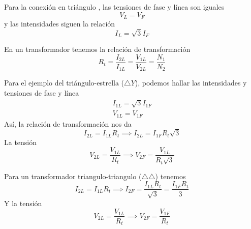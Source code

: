 \documentclass[11pt]{report}
\begin{document}
Para la conexión en triángulo , las tensiones de fase y línea son iguales
\begin{equation*}
  V_L = V_F
\end{equation*}
y las intensidades siguen la relación
\begin{equation*}
  I_L = \sqrt{3} I_F
\end{equation*}

En un transformador tenemos la relación de transformación
\begin{equation}
  R_t = \frac{I_{2L}}{I_{1L}} = \frac{V_{1L}}{V_{2L}} = \frac{N_1}{N_2}
\end{equation}

Para el ejemplo del triángulo-estrella ($\triangle Y$), podemos hallar las intensidades y
tensiones de fase y línea
\begin{equation*}
  \begin{split}
    I_{1L} = \sqrt{3} I_{1F}\\
    V_{1L} = V_{1F}
  \end{split}
\end{equation*}
Así, la relación de transformación nos da
\begin{equation*}
  I_{2L} = I_{1L} R_t \implies	I_{2L} = I_{1F} R_t \sqrt{3}
\end{equation*}
La tensión
\begin{equation*}
  V_{2L} = \frac{V_{1L}}{R_t} \implies V_{2F} = \frac{V_{1L}}{R_t \sqrt{3}}
\end{equation*}

Para un transformador triangulo-triangulo ($\triangle \triangle$) tenemos 
\begin{equation*}
  I_{2L} = I_{1L}R_t \implies I_{2F} = \frac{I_{1L} R_t}{\sqrt{3}} = \frac{I_{1F}R_t}{3}
\end{equation*}
Y la tensión 
\begin{equation*}
  V_{2L} = \frac{V_{1L}}{R_t} \implies V_{2F} = \frac{V_{1F}}{R_t} 
\end{equation*}
\end{document}
